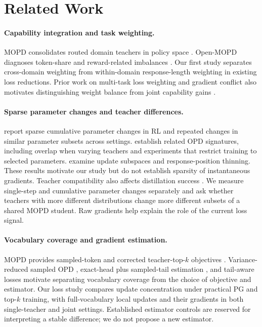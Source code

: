 \section{Related Work}

\paragraph{Capability integration and task weighting.}
MOPD consolidates routed domain teachers in policy space
\citep{ma2026mopdmultiteacheronpolicydistillation}.
Open-MOPD diagnoses token-share and reward-related imbalances
\citep{gao2026openmopddiagnosingfixingcapability}.
Our first study separates cross-domain weighting from within-domain
response-length weighting in existing loss reductions.
Prior work on multi-task loss weighting and gradient conflict also
motivates distinguishing weight balance from joint capability gains
\citep{chen2018gradnorm,yu2020gradientsurgerymultitasklearning}.

\paragraph{Sparse parameter changes and teacher differences.}
\citet{mukherjee2025subnetworks} report sparse cumulative parameter changes
in RL and repeated changes in similar parameter subsets across settings.
\citet{yu2026denseupdates} establish related OPD signatures, including
overlap when varying teachers and experiments that restrict training
to selected parameters. \citet{shen2026opdgeometry} examine update
subspaces and response-position thinning. These results motivate our
study but do not establish sparsity of instantaneous gradients.
Teacher compatibility also affects distillation success
\citep{li2026rethinkingopd,ma2026mopdmultiteacheronpolicydistillation}.
We measure single-step and cumulative parameter changes separately and
ask whether teachers with more different distributions change more
different subsets of a shared MOPD student. Raw gradients help explain
the role of the current loss signal.

\paragraph{Vocabulary coverage and gradient estimation.}
MOPD provides sampled-token and corrected teacher-top-$k$ objectives
\citep{ma2026mopdmultiteacheronpolicydistillation}.
Variance-reduced sampled OPD \citep{oh2026vopd}, exact-head plus
sampled-tail estimation \citep{zhang2026emapg}, and tail-aware losses
\citep{huang2026tailaware} motivate separating vocabulary coverage from
the choice of objective and estimator. Our loss study compares
update concentration under practical PG and top-$k$ training, with
full-vocabulary local updates and their gradients in both single-teacher
and joint settings. Established estimator controls are reserved for interpreting
a stable difference; we do not propose a new estimator.
